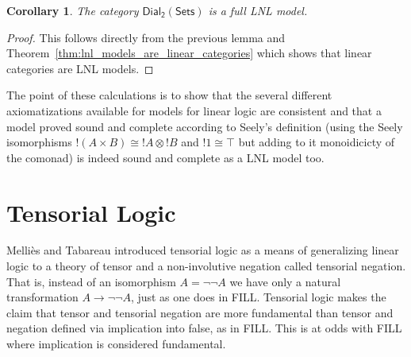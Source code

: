 \documentclass[preprint,12pt]{elsarticle}
\newcommand{\dial}[0]{\mathsf{Dial_2}(\mathsf{Sets})}
\newtheorem{corollary}[theorem]{Corollary}
\begin{document}
\begin{corollary}
  \label{corollary:dial-FLNL}
  The category $\dial$ is a full LNL model.
\end{corollary}
\begin{proof}
  This follows directly from the previous lemma and
  Theorem~\ref{thm:lnl_models_are_linear_categories} which shows that
  linear categories are LNL models.
\end{proof}


The point of these calculations is to show that the several different
axiomatizations available for models for linear logic are consistent
and that a model proved sound and complete according to Seely's
definition (using the Seely isomorphisms $!(A \times B)\cong !A\otimes
!B$ and $!1\cong \top$ but adding to it monoidicicty of the comonad)
is indeed sound and complete as a LNL model too.

\section{Tensorial Logic}
\label{sec:tensor_logic}

Melli\`es and Tabareau introduced tensorial logic \cite{Mellies:2008} as a means of
generalizing linear logic to a theory of tensor and a non-involutive
negation called tensorial negation.  That is, instead of an
isomorphism $A = \lnot\lnot A$ we have only a natural transformation
$A \to \lnot\lnot A$, just as one does in FILL.  Tensorial logic makes the
claim that tensor and tensorial negation are more fundamental than
tensor and negation defined via implication into false, as in FILL.  This is at odds with
FILL where implication is considered  fundamental. 
\end{document}
